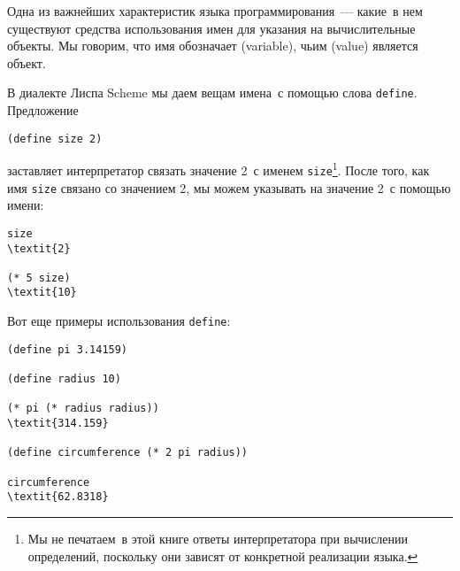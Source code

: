 Одна из важнейших характеристик языка программирования~---
какие~в нем существуют средства
использования
имен для
указания на вычислительные объекты.  Мы говорим, что имя
обозначает
 (variable), чьим 
 (value) является объект.

В диалекте Лиспа Scheme мы даем вещам имена~с помощью
слова {\tt define}.
Предложение

\begin{Verbatim}[fontsize=\small]
(define size 2)
\end{Verbatim}
заставляет интерпретатор связать значение 2~с именем
{\tt size}\footnote{Мы не печатаем~в этой книге ответы интерпретатора
при вычислении определений, поскольку они зависят от конкретной
реализации языка.%
}.
После того, как имя {\tt size} связано со значением 2,
мы можем указывать на значение 2~с помощью имени:

\begin{Verbatim}[fontsize=\small]
size
\textit{2}

(* 5 size)
\textit{10}
\end{Verbatim}

Вот еще примеры использования
{\tt define}:

\begin{Verbatim}[fontsize=\small]
(define pi 3.14159)

(define radius 10)

(* pi (* radius radius))
\textit{314.159}

(define circumference (* 2 pi radius))

circumference
\textit{62.8318}
\end{Verbatim}


